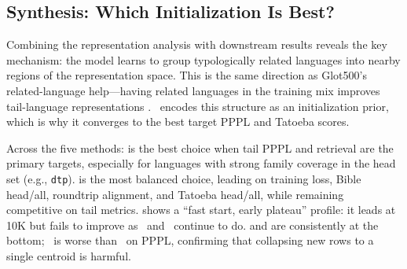 \subsection{Synthesis: Which Initialization Is Best?}

Combining the representation analysis with downstream results reveals the key mechanism:
the model learns to group typologically related languages into nearby regions of the
representation space.
This is the same direction as Glot500's related-language help---having related languages
in the training mix improves tail-language representations \citep{imani2023glot500}.
\famm\ encodes this structure as an initialization prior, which is why it converges
to the best target PPPL and Tatoeba scores.

Across the five methods:
\textbf{\famm} is the best choice when tail PPPL and retrieval are the primary targets,
especially for languages with strong family coverage in the head set (e.g., \texttt{dtp}).
\textbf{\wfvt} is the most balanced choice, leading on training loss,
Bible head/all, roundtrip alignment, and Tatoeba head/all, while remaining
competitive on tail metrics.
\textbf{\fvt} shows a ``fast start, early plateau'' profile: it leads at 10K but
fails to improve as \wfvt\ and \famm\ continue to do.
\textbf{\rand} and \textbf{\meanm} are consistently at the bottom;
\meanm\ is worse than \rand\ on PPPL, confirming that collapsing new rows to a
single centroid is harmful.
